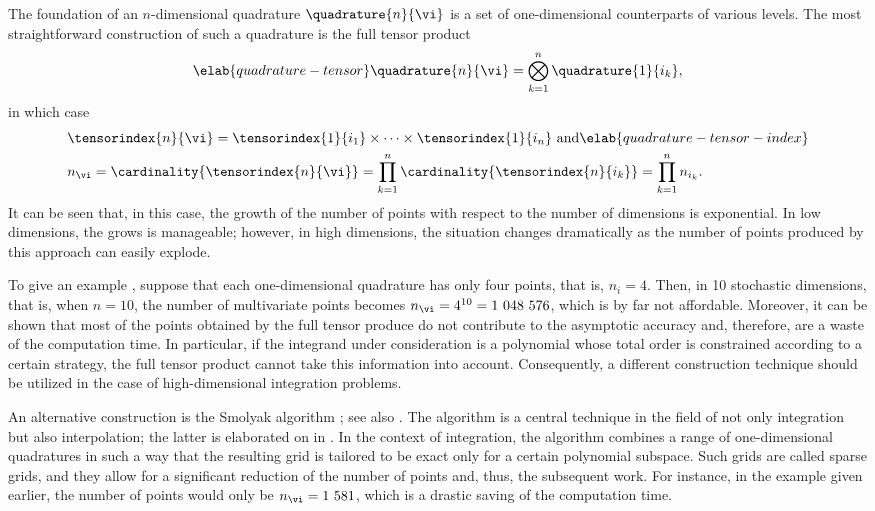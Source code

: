 The foundation of an $n$-dimensional quadrature $\quadrature{n}{\vi}$ is a set
of one-dimensional counterparts of various levels. The most straightforward
construction of such a quadrature is the full tensor product
\begin{equation} \elab{quadrature-tensor}
  \quadrature{n}{\vi} = \bigotimes_{k = 1}^n \quadrature{1}{i_k},
\end{equation}
in which case
\begin{align}
  & \tensorindex{n}{\vi}
  = \tensorindex{1}{i_1} \times \cdots \times \tensorindex{1}{i_n} \text{ and} \elab{quadrature-tensor-index} \\
  & n_{\vi}
  = \cardinality{\tensorindex{n}{\vi}}
  = \prod_{k = 1}^n \cardinality{\tensorindex{n}{i_k}}
  = \prod_{k = 1}^n n_{i_k}. \nonumber
\end{align}
It can be seen that, in this case, the growth of the number of points with
respect to the number of dimensions is exponential. In low dimensions, the grows
is manageable; however, in high dimensions, the situation changes dramatically
as the number of points produced by this approach can easily explode.

To give an example \cite{heiss2008}, suppose that each one-dimensional
quadrature has only four points, that is, $n_i = 4$. Then, in 10 stochastic
dimensions, that is, when $n = 10$, the number of multivariate points becomes
$n_{\vi} = 4^{10} = 1~048~576$, which is by far not affordable. Moreover, it can
be shown that most of the points obtained by the full tensor produce do not
contribute to the asymptotic accuracy and, therefore, are a waste of the
computation time. In particular, if the integrand under consideration is a
polynomial whose total order is constrained according to a certain strategy, the
full tensor product cannot take this information into account. Consequently, a
different construction technique should be utilized in the case of
high-dimensional integration problems.

An alternative construction is the Smolyak algorithm \cite{smolyak1963}; see
also \cite{klimke2006, eldred2008, heiss2008, maitre2010}. The algorithm is a
central technique in the field of not only integration but also interpolation;
the latter is elaborated on in . In the context of
integration, the algorithm combines a range of one-dimensional quadratures in
such a way that the resulting grid is tailored to be exact only for a certain
polynomial subspace. Such grids are called sparse grids, and they allow for a
significant reduction of the number of points and, thus, the subsequent work.
For instance, in the example given earlier, the number of points would only be
$n_{\vi} = 1~581$, which is a drastic saving of the computation time.

